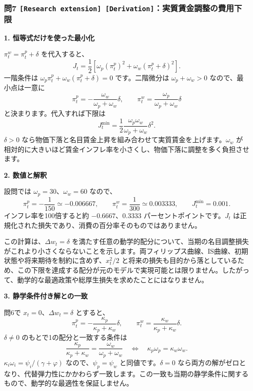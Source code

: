 \documentclass[
  japanese,
  lualatex,
  ja=standard,
  11pt,
  a4paper]{ltjsarticle}
\begin{document}
\subsubsection{\texorpdfstring{問7
\texttt{{[}Research\ extension{]}\ {[}Derivation{]}}：実質賃金調整の費用下限}{問7 {[}Research extension{]} {[}Derivation{]}：実質賃金調整の費用下限}}\label{ux554f7-research-extension-derivationux5b9fux8ceaux8cc3ux91d1ux8abfux6574ux306eux8cbbux7528ux4e0bux9650}

\textbf{1. 恒等式だけを使った最小化}

\(\pi_t^w=\pi_t^p+\delta\) を代入すると、 \[
J_t=\frac12\left[\omega_p(\pi_t^p)^2
+\omega_w(\pi_t^p+\delta)^2\right].
\] 一階条件は \(\omega_p\pi_t^p+\omega_w(\pi_t^p+\delta)=0\)
です。二階微分は \(\omega_p+\omega_w>0\) なので、最小点は一意に \[
\pi_t^p=-\frac{\omega_w}{\omega_p+\omega_w}\delta,
\qquad
\pi_t^w=\frac{\omega_p}{\omega_p+\omega_w}\delta
\] と決まります。代入すれば下限は \[
J_t^{\min}=\frac12\frac{\omega_p\omega_w}{\omega_p+\omega_w}\delta^2.
\] \(\delta>0\)
なら物価下落と名目賃金上昇を組み合わせて実質賃金を上げます。\(\omega_w\)
が相対的に大きいほど賃金インフレ率を小さくし、物価下落に調整を多く負担させます。

\textbf{2. 数値と解釈}

設問では \(\omega_p=30\)、\(\omega_w=60\) なので、 \[
\pi_t^p=-\frac1{150}\simeq-0.006667,
\qquad
\pi_t^w=\frac1{300}\simeq0.003333,
\qquad
J_t^{\min}=0.001.
\] インフレ率を100倍すると約 \(-0.6667\)、\(0.3333\)
パーセントポイントです。\(J_t\)
は正規化された損失であり、消費の百分率そのものではありません。

この計算は、\(\Delta w_t=\delta\)
を満たす任意の動学的配分について、当期の名目調整損失がこれより小さくならないことを示します。両フィリップス曲線、IS曲線、初期状態や将来期待を制約に含めず、\(x_t^2/2\)
と将来の損失も目的から落としているため、この下限を達成する配分が元のモデルで実現可能とは限りません。したがって、動学的な最適政策や総厚生損失を求めたことにはなりません。


\textbf{3. 静学条件付き解との一致}

問6で \(x_t=0\)、\(\Delta w_t=\delta\) とすると、 \[
\pi_t^p=-\frac{\kappa_p}{\kappa_p+\kappa_w}\delta,
\qquad
\pi_t^w=\frac{\kappa_w}{\kappa_p+\kappa_w}\delta.
\] \(\delta\ne0\) のもとで1の配分と一致する条件は \[
\frac{\kappa_p}{\kappa_p+\kappa_w}
=\frac{\omega_w}{\omega_p+\omega_w}
\quad\Longleftrightarrow\quad
\kappa_p\omega_p=\kappa_w\omega_w.
\] \(\kappa_i\omega_i=\psi_i/(\gamma+\varphi)\)
なので、\(\psi_p=\psi_w\) と同値です。\(\delta=0\)
なら両方の解がゼロとなり、代替弾力性にかかわらず一致します。この一致も当期の静学条件に関するもので、動学的な最適性を保証しません。
\end{document}
